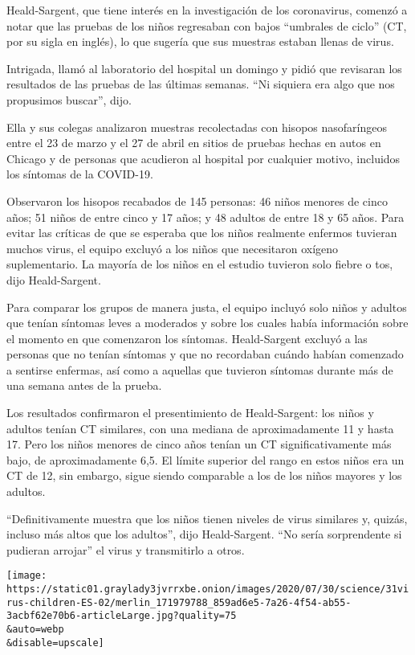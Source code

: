 Heald-Sargent, que tiene interés en la investigación de los coronavirus,
comenzó a notar que las pruebas de los niños regresaban con bajos
``umbrales de ciclo'' (CT, por su sigla en inglés), lo que sugería que
sus muestras estaban llenas de virus.

Intrigada, llamó al laboratorio del hospital un domingo y pidió que
revisaran los resultados de las pruebas de las últimas semanas. ``Ni
siquiera era algo que nos propusimos buscar'', dijo.

Ella y sus colegas analizaron muestras recolectadas con hisopos
nasofaríngeos entre el 23 de marzo y el 27 de abril en sitios de pruebas
hechas en autos en Chicago y de personas que acudieron al hospital por
cualquier motivo, incluidos los síntomas de la COVID-19.

Observaron los hisopos recabados de 145 personas: 46 niños menores de
cinco años; 51 niños de entre cinco y 17 años; y 48 adultos de entre 18
y 65 años. Para evitar las críticas de que se esperaba que los niños
realmente enfermos tuvieran muchos virus, el equipo excluyó a los niños
que necesitaron oxígeno suplementario. La mayoría de los niños en el
estudio tuvieron solo fiebre o tos, dijo Heald-Sargent.

Para comparar los grupos de manera justa, el equipo incluyó solo niños y
adultos que tenían síntomas leves a moderados y sobre los cuales había
información sobre el momento en que comenzaron los síntomas.
Heald-Sargent excluyó a las personas que no tenían síntomas y que no
recordaban cuándo habían comenzado a sentirse enfermas, así como a
aquellas que tuvieron síntomas durante más de una semana antes de la
prueba.

Los resultados confirmaron el presentimiento de Heald-Sargent: los niños
y adultos tenían CT similares, con una mediana de aproximadamente 11 y
hasta 17. Pero los niños menores de cinco años tenían un CT
significativamente más bajo, de aproximadamente 6,5. El límite superior
del rango en estos niños era un CT de 12, sin embargo, sigue siendo
comparable a los de los niños mayores y los adultos.

``Definitivamente muestra que los niños tienen niveles de virus
similares y, quizás, incluso más altos que los adultos'', dijo
Heald-Sargent. ``No sería sorprendente si pudieran arrojar'' el virus y
transmitirlo a otros.

\texttt{[image: https://static01.graylady3jvrrxbe.onion/images/2020/07/30/science/31virus-children-ES-02/merlin\_171979788\_859ad6e5-7a26-4f54-ab55-3acbf62e70b6-articleLarge.jpg?quality=75\\\&auto=webp\\\&disable=upscale]}

